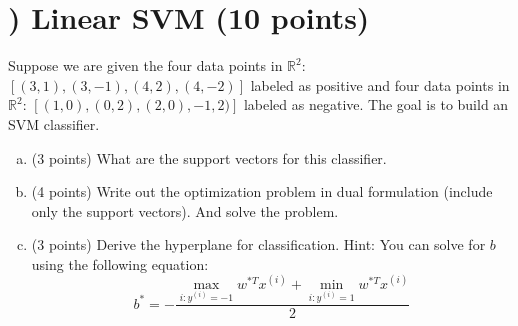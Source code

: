\documentclass[11pt]{article}
\newcounter{QuestionCounter}
\begin{document}
\section*{) Linear SVM (10 points)} 
Suppose we are given the four data points in $\mathbb{R}^2$: $\left[ (3,1), (3,-1), (4,2), (4,-2)\right ]$ labeled as positive and four data points in $\mathbb{R}^2$: $\left[ (1,0), (0,2), (2,0), -1,2)\right ]$ labeled as negative. The goal is to build an SVM classifier. 
\begin{enumerate}[(a)]
\item (3 points) What are the support vectors for this classifier.

\begin{answertext}{6cm}{}
    
\end{answertext} 
\newpage
\item (4 points) Write out the optimization problem in dual formulation (include only the support vectors). And solve the problem.

\begin{answertext}{22cm}{}
    
\end{answertext} 
\item (3 points) Derive the hyperplane for classification. Hint: You can solve for $b$ using the following equation: $$b^*=-\frac{\max_{i:y^{(i)}=-1}w^{*T}x^{(i)}+\min_{i:y^{(i)}=1}w^{*T}x^{(i)}}{2}$$

\begin{answertext}{16cm}{}
    
\end{answertext} 
\end{enumerate}
\end{document}
